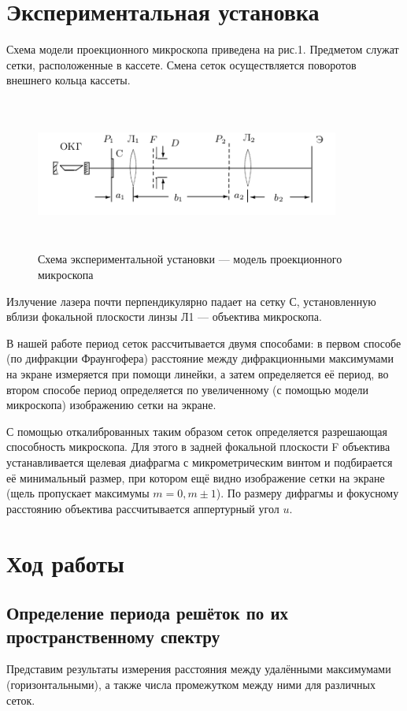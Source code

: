 \documentclass[12pt]{article}
\begin{document}
\section*{Экспериментальная установка}
\par
	Схема модели проекционного микроскопа приведена на рис.1. Предметом служат сетки, расположенные в кассете. Смена сеток осуществляется поворотов внешнего кольца кассеты.
\begin{figure}[h!]
	\centering
	\includegraphics[width = 10cm, height = 5cm]{image1.png}
	\caption{Схема экспериментальной установки --- модель проекционного микроскопа}	
\end{figure}
\par
	Излучение лазера почти перпендикулярно падает на сетку С, установленную вблизи фокальной плоскости линзы Л1 --- объектива микроскопа.
\par
	В нашей работе период сеток рассчитывается двумя способами: в первом способе (по дифракции Фраунгофера) расстояние между дифракционными максимумами на экране измеряется при помощи линейки, а затем определяется её период, во втором способе период определяется по увеличенному (с помощью модели микроскопа) изображению сетки на экране.
\par
	С помощью откалиброванных таким образом сеток определяется разрешающая способность микроскопа. Для этого в задней фокальной плоскости F объектива устанавливается щелевая диафрагма с микрометрическим винтом и подбирается её минимальный размер, при котором ещё видно изображение сетки на экране (щель пропускает максимумы $m = 0, m \pm 1$). По размеру дифрагмы и фокусному расстоянию объектива рассчитывается аппертурный угол $u$.

\section*{Ход работы}

\subsection*{Определение периода решёток по их пространственному спектру}
\par
	Представим результаты измерения расстояния между удалёнными максимумами (горизонтальными), а также числа промежутком между ними для различных сеток.	
\end{document}
